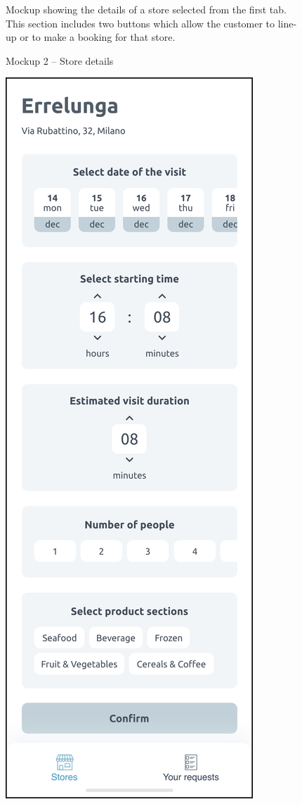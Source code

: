 \documentclass[a4paper,oneside,11pt]{book}
\newcommand{\captiondd}[2]{\caption{#1}\par\begin{center}\vspace{-.01\textheight}\small#2.\end{center}}
\begin{document}
\begin{multicols}{2}
\begin{figure}[H]
            \captiondd{Mockup 2 -- Store details}{Mockup showing the details of a store selected from the first tab. This section includes two buttons which allow the customer to line-up or to make a booking for that store}
            \label{figure:mockup_2}
        \end{figure}
    \end{multicols}
    \newpage
    \begin{figure}[H]
            \centering
            \includegraphics[width=\textwidth, height=.9\textheight, keepaspectratio]{pictures/mockups/book_a_visit}

\end{figure}
\end{document}
